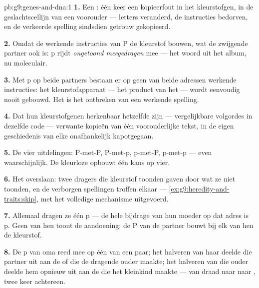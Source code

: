 \begin{solution}{pb:g9:genes-and-dna:1}
\textbf{1.} Een : één keer een kopieerfout in het
kleurstofgen, in de geslachtscellijn van een voorouder ---
letters veranderd, de instructies bedorven, en de verkeerde
spelling sindsdien getrouw gekopieerd.

\textbf{2.} Omdat de werkende instructies van P de kleurstof
bouwen, wat de zwijgende partner ook is: p rijdt
\emph{ongetoond meegedragen} mee --- het woord uit het album, nu
moleculair.

\textbf{3.} Met p op beide partners bestaan er op geen van beide
adressen werkende instructies: het kleurstofapparaat --- het
product van het  --- wordt eenvoudig nooit gebouwd. Het
 is het ontbreken van een werkende spelling.

\textbf{4.} Dat hun kleurstofgenen herkenbaar hetzelfde  zijn
--- vergelijkbare volgordes in dezelfde code --- verwante kopieën
van één voorouderlijke tekst, in de eigen geschiedenis van elke
 onafhankelijk kapotgegaan.

\textbf{5.} De vier uitdelingen: P-met-P, P-met-p, p-met-P,
p-met-p --- even waarschijnlijk. De kleurloze opbouw: één kans op
vier.

\textbf{6.} Het overslaan: twee dragers die kleurstof toonden
gaven door wat ze niet toonden, en de verborgen spellingen
troffen elkaar --- \cref{ex:g9:heredity-and-traits:skip}, met het
volledige mechanisme uitgevoerd.

\textbf{7.} Allemaal dragen ze één p --- de hele bijdrage van hun
moeder op dat adres is p. Geen van hen toont de aandoening: de P
van de partner bouwt bij elk van hen de kleurstof.

\textbf{8.} De p van oma reed mee op één  van een paar;
het halveren van haar  deelde die partner uit aan de
 of  die de dragende ouder maakte; het halveren van
die ouder deelde hem opnieuw uit aan de  die het
kleinkind maakte --- van draad naar  naar ,
twee keer achtereen.


\end{solution}
